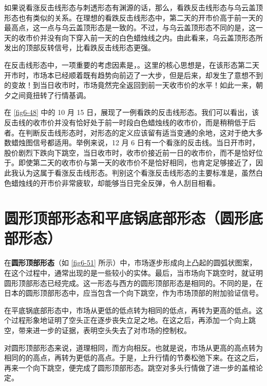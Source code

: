 如果说看涨反击线形态与刺透形态有渊源的话，那么，看跌反击线形态与乌云盖顶形态也有类似的关系。在理想的看跌反击线形态中，第二天的开市价高于前一天的最高点，这一点与乌云盖顶形态是一致的。不过，与乌云盖顶形态不同的是，这一天的收市价并没有向下穿入前一天的白色蜡烛线之内。由此看来，乌云盖顶形态所发出的顶部反转信号，比看跌反击线形态更强。

在反击线形态中，一项重要的考虑因素是，。这里的核心思想是，在该形态第二天开市时，市场本已经顺着既有趋势向前迈了一大步，但是后来，却发生了意想不到的变故！到当日收市时，市场竟然完全返回到前一天收市价的水平！如此一来，朝夕之间竟扭转了行情基调。

在 \autoref{fig6-48} 中的 10 月 15 日，展现了一例看跌的反击线形态。我们可以看出，该反击线的收市价并没有恰好处于前一时段白色蜡烛线的收市价，而是稍稍低于后者。在判断反击线形态时，对形态的定义应该留有适当变通的余地，这对于绝大多数蜡烛图信号都适用。举例来说，12 月 6 日有一个看涨的反击线。当日开市时，股价剧烈下跌向下跳空，当日收市时，收市价接近前一日的收市价，而不是恰好位于。即使第二天的收市价与第一天的收市价不是恰好相同，也肯定足够接近了，因此我认为这属于看涨反击线形态。判别这个看涨反击线形态的主要标准是，虽然白色蜡烛线的开市价非常疲软，却能够当日完全反弹，令人刮目相看。

\section{圆形顶部形态和平底锅底部形态（圆形底部形态）}
在\textbf{圆形顶部形态}（如 \autoref{fig6-51} 所示）中，市场逐步形成向上凸起的圆弧状图案，在这个过程中，通常出现的是一些较小的实体。最后，当市场向下跳空时，就证明圆形顶部形态已经完成。这一形态与西方的圆形顶部形态是相同的。不同的是，在日本的圆形顶部形态中，应当包含一个向下跳空，作为市场顶部的附加验证信号。


在平底锅底部形态中，市场从更低的低点转为相同的低点，再转为更高的低点。这个过程形象地证明了空头正在逐步丧失立足之地。在这之后，再添加一个向上跳空，带来进一步的证据，表明空头失去了对市场的控制权。

对圆形顶部形态来说，道理相同，而方向相反。也就是说，市场从更高的高点转为相同的的高点，再转为更低的高点。于是，上升行情的节奏松弛下来。在这之后，再来一个向下跳空，便完成了圆形顶部形态。跳空对多头行情做了进一步的盖棺论定。

